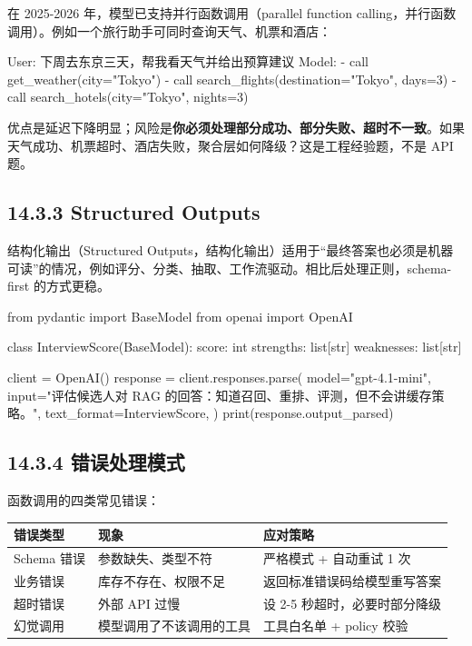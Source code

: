 在 2025-2026 年，模型已支持并行函数调用（parallel function calling，并行函数调用）。例如一个旅行助手可同时查询天气、机票和酒店：


\begin{codeblock}
User: 下周去东京三天，帮我看天气并给出预算建议
Model:
  - call get_weather(city="Tokyo")
  - call search_flights(destination="Tokyo", days=3)
  - call search_hotels(city="Tokyo", nights=3)
\end{codeblock}

优点是延迟下降明显；风险是\textbf{你必须处理部分成功、部分失败、超时不一致}。如果天气成功、机票超时、酒店失败，聚合层如何降级？这是工程经验题，不是 API 题。


\subsection{14.3.3 Structured Outputs}

结构化输出（Structured Outputs，结构化输出）适用于``最终答案也必须是机器可读''的情况，例如评分、分类、抽取、工作流驱动。相比后处理正则，schema-first 的方式更稳。


\begin{codeblock}
from pydantic import BaseModel
from openai import OpenAI

class InterviewScore(BaseModel):
    score: int
    strengths: list[str]
    weaknesses: list[str]

client = OpenAI()
response = client.responses.parse(
    model="gpt-4.1-mini",
    input="评估候选人对 RAG 的回答：知道召回、重排、评测，但不会讲缓存策略。",
    text_format=InterviewScore,
)
print(response.output_parsed)
\end{codeblock}

\subsection{14.3.4 错误处理模式}

函数调用的四类常见错误：


\begingroup
\scriptsize
\setlength{\tabcolsep}{3pt}
\begin{longtable}{|p{}|p{}|p{}|}
\hline
错误类型 & 现象 & 应对策略 \\ \hline
Schema 错误 & 参数缺失、类型不符 & 严格模式 + 自动重试 1 次 \\ \hline
业务错误 & 库存不存在、权限不足 & 返回标准错误码给模型重写答案 \\ \hline
超时错误 & 外部 API 过慢 & 设 2-5 秒超时，必要时部分降级 \\ \hline
幻觉调用 & 模型调用了不该调用的工具 & 工具白名单 + policy 校验 \\ \hline
\end{longtable}
\endgroup

